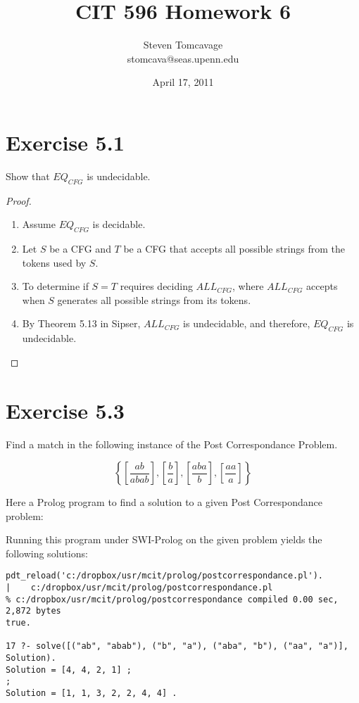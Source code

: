 \documentclass{article}
\title{CIT 596 Homework 6}
\author{Steven Tomcavage\\stomcava@seas.upenn.edu}
\date{April 17, 2011}
\begin{document}
\maketitle

\section{Exercise 5.1}

Show that $EQ_{CFG}$ is undecidable.

\begin{proof}
	\mbox{}
	\begin{enumerate}
	  \item Assume $EQ_{CFG}$ is decidable. 
	  \item Let $S$ be a CFG and $T$ be a CFG that accepts all possible strings
	  from the tokens used by $S$.
	  \item To determine if $S = T$ requires deciding $ALL_{CFG}$, where
	  $ALL_{CFG}$ accepts when $S$ generates all possible strings from its
	  tokens.
	  \item By Theorem 5.13 in Sipser, $ALL_{CFG}$ is undecidable, and therefore,
	  $EQ_{CFG}$ is undecidable. \qedhere
	\end{enumerate}
\end{proof}

\section{Exercise 5.3}

Find a match in the following instance of the Post Correspondance Problem.

\begin{equation*}
	\left\{ \left[\frac{ab}{abab}\right], \left[\frac{b}{a}\right],
	\left[\frac{aba}{b}\right], \left[\frac{aa}{a}\right] \right\}
\end{equation*}

Here a Prolog program to find a solution to a given Post Correspondance problem:



Running this program under SWI-Prolog on the given problem yields the following
solutions:
 
\begin{verbatim}
pdt_reload('c:/dropbox/usr/mcit/prolog/postcorrespondance.pl').
|    c:/dropbox/usr/mcit/prolog/postcorrespondance.pl
% c:/dropbox/usr/mcit/prolog/postcorrespondance compiled 0.00 sec, 2,872 bytes
true.

17 ?- solve([("ab", "abab"), ("b", "a"), ("aba", "b"), ("aa", "a")], Solution).
Solution = [4, 4, 2, 1] ;
;
Solution = [1, 1, 3, 2, 2, 4, 4] .
\end{verbatim}
\end{document}
